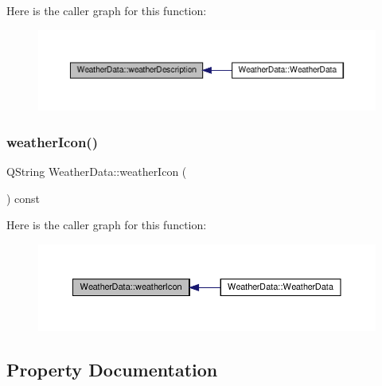 Here is the caller graph for this function\+:\nopagebreak
\begin{figure}[H]
\begin{center}
\leavevmode
\includegraphics[width=350pt]{class_weather_data_a63a3528697c8681bd32d4d170ec91f76_icgraph}
\end{center}
\end{figure}
\mbox{\label{class_weather_data_a5baf2d9cc08741d7af4a07d61df95ee4}} 
\subsubsection{\texorpdfstring{weather\+Icon()}{weatherIcon()}}
{\footnotesize\ttfamily Q\+String Weather\+Data\+::weather\+Icon (\begin{DoxyParamCaption}{ }\end{DoxyParamCaption}) const}

Here is the caller graph for this function\+:\nopagebreak
\begin{figure}[H]
\begin{center}
\leavevmode
\includegraphics[width=350pt]{class_weather_data_a5baf2d9cc08741d7af4a07d61df95ee4_icgraph}
\end{center}
\end{figure}


\subsection{Property Documentation}
\mbox{\label{class_weather_data_a483043396f44ae957716ebb005644d0d}} 
